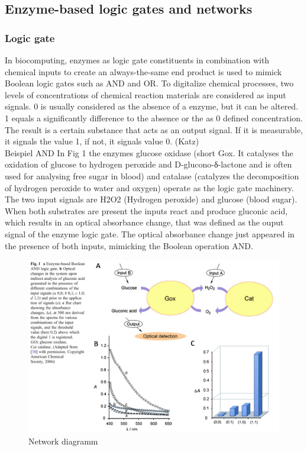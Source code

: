 \documentclass[runningheads]{llncs}
\begin{document}
\subsection{Enzyme-based logic gates and networks}	
	\subsubsection{Logic gate}	
		In biocomputing, enzymes as logic gate constituents in combination with chemical inputs to create an always-the-same end product is used to mimick Boolean logic gates such as AND and OR. To digitalize chemical processes, two levels of concentrations of chemical reaction materials are considered as input signals. 0 is usually considered as the absence of a enzyme, but it can be altered. 1 equals a  significantly difference to the absence or the as 0 defined concentration.
		The result is a certain substance that acts as an output signal. If it is measurable, it signals the value 1, if not, it signals value 0.
	(Katz) \\
	
		Beispiel AND 
		In Fig 1 the enzymes glucose oxidase (short Gox. It catalyses the oxidation of glucose to hydrogen peroxide and D-glucono-δ-lactone and is often used for analysing free sugar in blood) and catalase (catalyzes the decomposition of hydrogen peroxide to water and oxygen) operate as the logic gate machinery. The two input signals are H2O2 (Hydrogen peroxide) and glucose (blood sugar). When both substrates are present the inputs react and produce gluconic acid, which results in an optical absorbance change, that was defined as the ouput signal of the enzyme logic gate. The optical absorbance change just appeared in the presence of both inputs, mimicking the Boolean operation AND. 
		
		\begin{figure}[H] \centering \includegraphics[scale= 0.3]{pics/AND.png} \caption{Network diagramm} \label{img:and} \end{figure}
	
\end{document}
